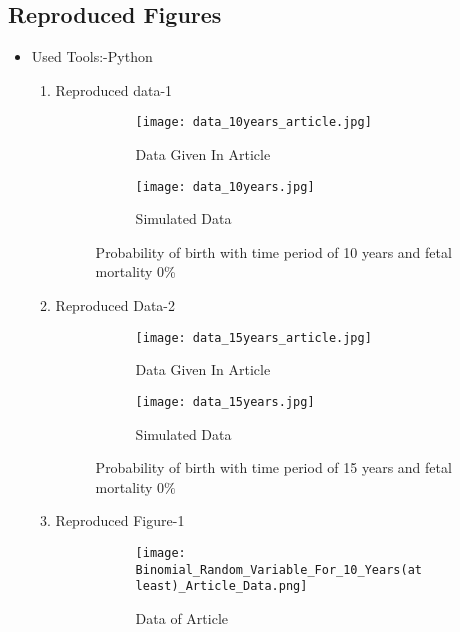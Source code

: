 \documentclass{article}
\begin{document}
\subsection{Reproduced Figures}
\begin{itemize}
\item Used Tools:-Python

\begin{enumerate}
\item Reproduced data-1\\
\begin{figure}[htp]
\centering
\begin{subfigure}{.5\textwidth}
  \centering
  \texttt{[image: data\_10years\_article.jpg]}
  \caption{Data Given In Article }
  \label{fig:sub1}
\end{subfigure}%
\begin{subfigure}{.5\textwidth}
\centering
  \texttt{[image: data\_10years.jpg]}
  \caption{Simulated Data}
  \label{fig:sub2}
\end{subfigure}
\caption{Probability of birth with time period of 10 years and fetal mortality 0\%}
\label{fig:test}
\end{figure}
\newpage
\item Reproduced Data-2\\
\begin{figure}[htp]
\centering
\begin{subfigure}{.5\textwidth}
  \centering
  \texttt{[image: data\_15years\_article.jpg]}
  \caption{Data Given In Article}
  \label{fig:sub1}
\end{subfigure}%
\begin{subfigure}{.5\textwidth}
  \centering
  \texttt{[image: data\_15years.jpg]}
  \caption{Simulated Data}
  \label{fig:sub2}
\end{subfigure}
\caption{Probability of birth with time period of 15 years and fetal mortality 0$\%$}
\label{fig:test}
\end{figure}
\item Reproduced Figure-1\\
\begin{figure}[htp]
\centering
\begin{subfigure}{.5\textwidth}
  \centering
  \texttt{[image: Binomial\_Random\_Variable\_For\_10\_Years(at least)\_Article\_Data.png]}
  \caption{Data of Article}
  \label{fig:sub1}
\end{subfigure}%
\begin{subfigure}{.5\textwidth}

\end{subfigure}
\end{figure}
\end{enumerate}
\end{itemize}
\end{document}

